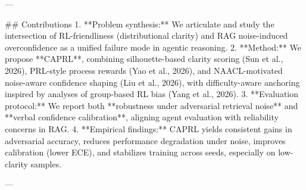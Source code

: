 ---

## Contributions  
1. **Problem synthesis:** We articulate and study the intersection of RL-friendliness (distributional clarity) and RAG noise-induced overconfidence as a unified failure mode in agentic reasoning.  
2. **Method:** We propose **CAPRL**, combining silhouette-based clarity scoring (Sun et al., 2026), PRL-style process rewards (Yao et al., 2026), and NAACL-motivated noise-aware confidence shaping (Liu et al., 2026), with difficulty-aware anchoring inspired by analyses of group-based RL bias (Yang et al., 2026).  
3. **Evaluation protocol:** We report both **robustness under adversarial retrieval noise** and **verbal confidence calibration**, aligning agent evaluation with reliability concerns in RAG.  
4. **Empirical findings:** CAPRL yields consistent gains in adversarial accuracy, reduces performance degradation under noise, improves calibration (lower ECE), and stabilizes training across seeds, especially on low-clarity samples.

---